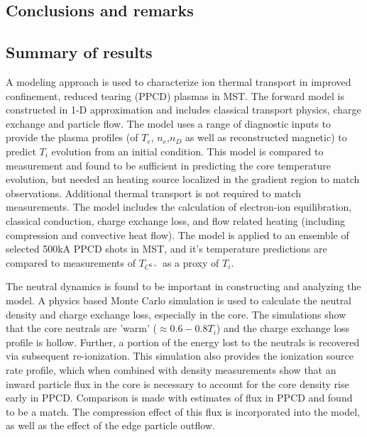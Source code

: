 \begin{refsection}


\chapter{Conclusions and remarks}

\section{Summary of results}

A modeling approach is used to characterize ion thermal transport in improved confinement, reduced tearing (PPCD) plasmas in MST. The forward model is constructed in 1-D approximation and includes classical transport physics, charge exchange and particle flow. The model uses a range of diagnostic inputs to provide the plasma profiles (of $T_e$, $n_e$,$n_D$ as well as reconstructed magnetic) to predict $T_i$ evolution from an initial condition. This model is compared to measurement and found to be sufficient in predicting the core temperature evolution, but needed an \adhoc heating source localized in the gradient region to match observations. Additional thermal transport is not required to match measurements. The model includes the calculation of electron-ion equilibration, classical conduction, charge exchange loss, and flow related heating (including compression and convective heat flow). The model is applied to an ensemble of selected 500kA PPCD shots in MST, and it's temperature predictions are compared to measurements of $T_{C^{6+}}$ as a proxy of $T_i$.

The neutral dynamics is found to be important in constructing and analyzing the model. A physics based Monte Carlo simulation is used to calculate the neutral density and charge exchange loss, especially in the core. The simulations show that the core neutrals are 'warm' ($\approx 0.6-0.8 T_i$) and the charge exchange loss profile is hollow. Further, a portion of the energy lost to the neutrals is recovered via subsequent re-ionization. This simulation also provides the ionization source rate profile, which when combined with density measurements show that an inward particle flux in the core is necessary to account for the core density rise early in PPCD. Comparison is made with estimates of \ecb flux in PPCD and found to be a match. The compression effect of this flux is incorporated into the model, as well as the effect of the edge particle outflow. 


\end{refsection}
